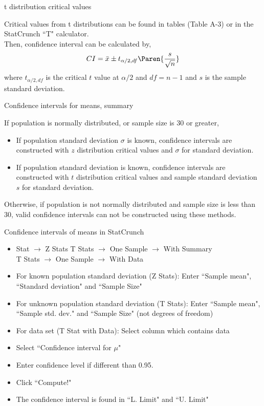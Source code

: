 \documentclass[xcolor=table, handout]{beamer}
\begin{document}
\begin{frame}{t distribution critical values}
\begin{block}{}
\large
Critical values from t distributions can be found in tables (Table A-3) or in the StatCrunch ``T" calculator.\\
\pause\medskip
Then, confidence interval can be calculated by,
\[CI = \bar x \pm t_{\alpha/2, df} \Paren{\frac s {\sqrt n}}\]
where $t_{\alpha/2, df}$ is the critical $t$ value at $\alpha/2$ and $df=n-1$ and $s$ is the sample standard deviation.
\end{block}
\end{frame}

\begin{frame}{Confidence intervals for means, summary}
\begin{block}{}
\large
If population is normally distributed, or sample size is 30 or greater,
\begin{itemize}
\pause\item If population standard deviation $\sigma$ is known, confidence intervals are constructed with $z$ distribution critical values and $\sigma$ for standard deviation.
\pause\item If population standard deviation is  known, confidence intervals are constructed with $t$ distribution critical values and sample standard deviation $s$ for standard deviation.
\end{itemize}
\pause Otherwise, if population is not normally distributed and sample size is less than 30, valid confidence intervals can not be constructed using these methods.
\end{block}
\end{frame}

\begin{frame}{Confidence intervals of means in StatCrunch}
\begin{block}{}
\large
\begin{itemize}
\item Stat $\to$ Z Stats  T Stats $\to$ One Sample $\to$ With Summary \\T Stats $\to$ One Sample $\to$ With Data
\item For known population standard deviation (Z Stats): Enter ``Sample mean", ``Standard deviation" and ``Sample Size" 
\item For unknown population standard deviation (T Stats): Enter ``Sample mean", ``Sample std. dev." and ``Sample Size" (not degrees of freedom)
\item For data set (T Stat with Data): Select column which contains data
\item Select ``Confidence interval for $\mu$"
\item Enter confidence level if different than 0.95.
\item Click ``Compute!"
\item The confidence interval is found in ``L. Limit" and ``U. Limit"
\end{itemize}
\end{block}
\end{frame}
\end{document}
